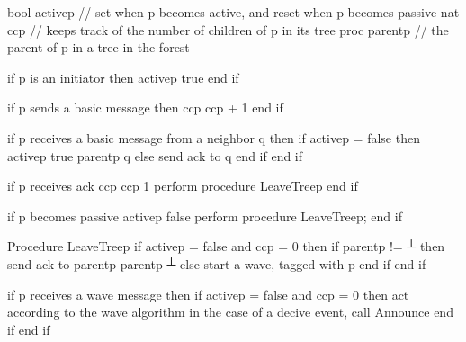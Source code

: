 \documentclass[letterpaper,10pt,english]{sphinxmanual}
\begin{document}
\def\sphinxLiteralBlockLabel{\label{\detokenize{docs/ShavitFrancez/algorithm:id12}}\label{\detokenize{docs/ShavitFrancez/algorithm:shavitfrancezterminationdetectionalgorithm}}}
\begin{sphinxVerbatim}[commandchars=\\\{\},numbers=left,firstnumber=1,stepnumber=1]
bool active\PYGZlt{}p\PYGZgt{} // set when p becomes active, and reset when p becomes passive
nat cc\PYGZlt{}p\PYGZgt{} // keeps track of the number of children of p in its tree
proc parent\PYGZlt{}p\PYGZgt{} // the parent of p in a tree in the forest

if p is an initiator then
   active\PYGZlt{}p\PYGZgt{} \PYGZlt{}\PYGZhy{} true
end if

if p sends a basic message then
   cc\PYGZlt{}p\PYGZgt{} \PYGZlt{}\PYGZhy{} cc\PYGZlt{}p\PYGZgt{} + 1
end if

if p receives a basic message from a neighbor q then
   if active\PYGZlt{}p\PYGZgt{} = false then
      active\PYGZlt{}p\PYGZgt{} \PYGZlt{}\PYGZhy{} true
      parent\PYGZlt{}p\PYGZgt{} \PYGZlt{}\PYGZhy{} q
   else
      send \PYGZlt{}ack\PYGZgt{} to q
   end if
end if

if p receives \PYGZlt{}ack\PYGZgt{}
   cc\PYGZlt{}p\PYGZgt{} \PYGZlt{}\PYGZhy{} cc\PYGZlt{}p\PYGZgt{} \PYGZhy{} 1
   perform procedure LeaveTree\PYGZlt{}p\PYGZgt{}
end if

if p becomes passive
   active\PYGZlt{}p\PYGZgt{} \PYGZlt{}\PYGZhy{} false
   perform procedure LeaveTree\PYGZlt{}p\PYGZgt{};
end if

Procedure LeaveTree\PYGZlt{}p\PYGZgt{}
   if active\PYGZlt{}p\PYGZgt{} = false and cc\PYGZlt{}p\PYGZgt{} = 0 then
       if parent\PYGZlt{}p\PYGZgt{} != ┴ then
             send \PYGZlt{}ack\PYGZgt{} to parent\PYGZlt{}p\PYGZgt{}
             parent\PYGZlt{}p\PYGZgt{} \PYGZlt{}\PYGZhy{} ┴
       else
         start a wave, tagged with p
   end if
end if

if p receives a wave message then
   if active\PYGZlt{}p\PYGZgt{} = false and cc\PYGZlt{}p\PYGZgt{} = 0 then
       act according to the wave algorithm
       in the case of a decive event, call Announce
   end if
end if
\end{sphinxVerbatim}
\end{document}

